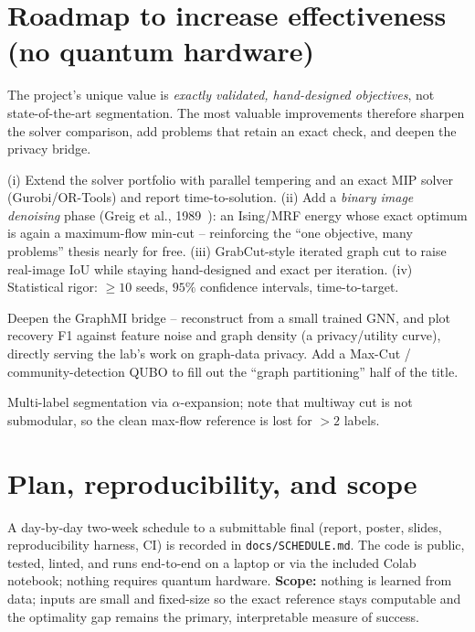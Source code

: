 \documentclass[11pt]{article}
\newcommand{\code}[1]{\texttt{\small #1}}
\begin{document}
\section{Roadmap to increase effectiveness (no quantum hardware)}
The project's unique value is \emph{exactly validated, hand-designed
objectives}, not state-of-the-art segmentation. The most valuable improvements
therefore sharpen the solver comparison, add problems that retain an exact
check, and deepen the privacy bridge.
\begin{description}\itemsep2pt
  \item[Tier 1 (keeps exact validation).]
    (i) Extend the solver portfolio with parallel tempering and an exact MIP
    solver (Gurobi/OR-Tools) and report time-to-solution.
    (ii) Add a \emph{binary image denoising} phase (Greig et al.,
    1989~\cite{greig}): an Ising/MRF energy whose exact optimum is again a
    maximum-flow min-cut -- reinforcing the ``one objective, many problems''
    thesis nearly for free.
    (iii) GrabCut-style iterated graph cut to raise real-image IoU while staying
    hand-designed and exact per iteration.
    (iv) Statistical rigor: $\ge 10$ seeds, $95\%$ confidence intervals,
    time-to-target.
  \item[Tier 2 (research upside).]
    Deepen the GraphMI bridge -- reconstruct from a small trained GNN, and plot
    recovery F1 against feature noise and graph density (a privacy/utility
    curve), directly serving the lab's work on graph-data privacy. Add a
    Max-Cut / community-detection QUBO to fill out the ``graph partitioning''
    half of the title.
  \item[Tier 3 (scope expansion, trades the exact check).]
    Multi-label segmentation via $\alpha$-expansion; note that multiway cut is
    not submodular, so the clean max-flow reference is lost for $>2$ labels.
\end{description}

\section{Plan, reproducibility, and scope}
A day-by-day two-week schedule to a submittable final (report, poster, slides,
reproducibility harness, CI) is recorded in \code{docs/SCHEDULE.md}. The code is
public, tested, linted, and runs end-to-end on a laptop or via the included
Colab notebook; nothing requires quantum hardware. \textbf{Scope:} nothing is
learned from data; inputs are small and fixed-size so the exact reference stays
computable and the optimality gap remains the primary, interpretable measure of
success.
\end{document}
